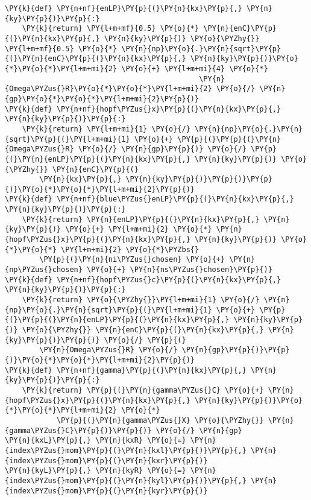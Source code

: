 \begin{Verbatim}[commandchars=\\\{\}]
\PY{k}{def} \PY{n+nf}{enLP}\PY{p}{(}\PY{n}{kx}\PY{p}{,} \PY{n}{ky}\PY{p}{)}\PY{p}{:}
    \PY{k}{return} \PY{l+m+mf}{0.5} \PY{o}{*} \PY{n}{enC}\PY{p}{(}\PY{n}{kx}\PY{p}{,} \PY{n}{ky}\PY{p}{)} \PY{o}{\PYZhy{}} \PY{l+m+mf}{0.5} \PY{o}{*} \PY{n}{np}\PY{o}{.}\PY{n}{sqrt}\PY{p}{(}\PY{n}{enC}\PY{p}{(}\PY{n}{kx}\PY{p}{,} \PY{n}{ky}\PY{p}{)}\PY{o}{*}\PY{o}{*}\PY{l+m+mi}{2} \PY{o}{+} \PY{l+m+mi}{4} \PY{o}{*}
                                             \PY{n}{Omega\PYZus{}R}\PY{o}{*}\PY{o}{*}\PY{l+m+mi}{2} \PY{o}{/} \PY{n}{gp}\PY{o}{*}\PY{o}{*}\PY{l+m+mi}{2}\PY{p}{)}
\PY{k}{def} \PY{n+nf}{hopf\PYZus{}x}\PY{p}{(}\PY{n}{kx}\PY{p}{,} \PY{n}{ky}\PY{p}{)}\PY{p}{:}
    \PY{k}{return} \PY{l+m+mi}{1} \PY{o}{/} \PY{n}{np}\PY{o}{.}\PY{n}{sqrt}\PY{p}{(}\PY{l+m+mi}{1} \PY{o}{+} \PY{p}{(}\PY{p}{(}\PY{n}{Omega\PYZus{}R} \PY{o}{/} \PY{n}{gp}\PY{p}{)} \PY{o}{/} \PY{p}{(}\PY{n}{enLP}\PY{p}{(}\PY{n}{kx}\PY{p}{,} \PY{n}{ky}\PY{p}{)} \PY{o}{\PYZhy{}} \PY{n}{enC}\PY{p}{(}
        \PY{n}{kx}\PY{p}{,} \PY{n}{ky}\PY{p}{)}\PY{p}{)}\PY{p}{)}\PY{o}{*}\PY{o}{*}\PY{l+m+mi}{2}\PY{p}{)}
\PY{k}{def} \PY{n+nf}{blue\PYZus{}enLP}\PY{p}{(}\PY{n}{kx}\PY{p}{,} \PY{n}{ky}\PY{p}{)}\PY{p}{:}
    \PY{k}{return} \PY{n}{enLP}\PY{p}{(}\PY{n}{kx}\PY{p}{,} \PY{n}{ky}\PY{p}{)} \PY{o}{+} \PY{l+m+mi}{2} \PY{o}{*} \PY{n}{hopf\PYZus{}x}\PY{p}{(}\PY{n}{kx}\PY{p}{,} \PY{n}{ky}\PY{p}{)} \PY{o}{*}\PY{o}{*} \PY{l+m+mi}{2} \PY{o}{*}\PYZbs{}
        \PY{p}{(}\PY{n}{ni\PYZus{}chosen} \PY{o}{+} \PY{n}{np\PYZus{}chosen} \PY{o}{+} \PY{n}{ns\PYZus{}chosen}\PY{p}{)}
\PY{k}{def} \PY{n+nf}{hopf\PYZus{}c}\PY{p}{(}\PY{n}{kx}\PY{p}{,} \PY{n}{ky}\PY{p}{)}\PY{p}{:}
    \PY{k}{return} \PY{o}{\PYZhy{}}\PY{l+m+mi}{1} \PY{o}{/} \PY{n}{np}\PY{o}{.}\PY{n}{sqrt}\PY{p}{(}\PY{l+m+mi}{1} \PY{o}{+} \PY{p}{(}\PY{p}{(}\PY{n}{enLP}\PY{p}{(}\PY{n}{kx}\PY{p}{,} \PY{n}{ky}\PY{p}{)} \PY{o}{\PYZhy{}} \PY{n}{enC}\PY{p}{(}\PY{n}{kx}\PY{p}{,} \PY{n}{ky}\PY{p}{)}\PY{p}{)} \PY{o}{/} \PY{p}{(}
        \PY{n}{Omega\PYZus{}R} \PY{o}{/} \PY{n}{gp}\PY{p}{)}\PY{p}{)}\PY{o}{*}\PY{o}{*}\PY{l+m+mi}{2}\PY{p}{)}
\PY{k}{def} \PY{n+nf}{gamma}\PY{p}{(}\PY{n}{kx}\PY{p}{,} \PY{n}{ky}\PY{p}{)}\PY{p}{:}
    \PY{k}{return} \PY{p}{(}\PY{n}{gamma\PYZus{}C} \PY{o}{+} \PY{n}{hopf\PYZus{}x}\PY{p}{(}\PY{n}{kx}\PY{p}{,} \PY{n}{ky}\PY{p}{)}\PY{o}{*}\PY{o}{*}\PY{l+m+mi}{2} \PY{o}{*}
            \PY{p}{(}\PY{n}{gamma\PYZus{}X} \PY{o}{\PYZhy{}} \PY{n}{gamma\PYZus{}C}\PY{p}{)}\PY{p}{)} \PY{o}{/} \PY{n}{gp}
\PY{n}{kxL}\PY{p}{,} \PY{n}{kxR} \PY{o}{=} \PY{n}{index\PYZus{}mom}\PY{p}{(}\PY{n}{kxl}\PY{p}{)}\PY{p}{,} \PY{n}{index\PYZus{}mom}\PY{p}{(}\PY{n}{kxr}\PY{p}{)}
\PY{n}{kyL}\PY{p}{,} \PY{n}{kyR} \PY{o}{=} \PY{n}{index\PYZus{}mom}\PY{p}{(}\PY{n}{kyl}\PY{p}{)}\PY{p}{,} \PY{n}{index\PYZus{}mom}\PY{p}{(}\PY{n}{kyr}\PY{p}{)}

\end{Verbatim}
